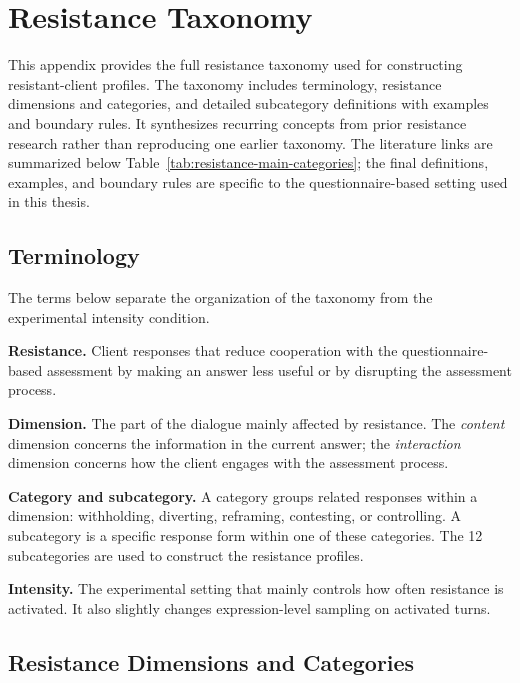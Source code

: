 
\section{Resistance Taxonomy}
\label{s:appendix-taxonomy}

This appendix provides the full resistance taxonomy used for constructing resistant-client profiles. The taxonomy includes terminology, resistance dimensions and categories, and detailed subcategory definitions with examples and boundary rules. It synthesizes recurring concepts from prior resistance research rather than reproducing one earlier taxonomy. The literature links are summarized below Table~\ref{tab:resistance-main-categories}; the final definitions, examples, and boundary rules are specific to the questionnaire-based setting used in this thesis.

\subsection{Terminology}

The terms below separate the organization of the taxonomy from the experimental intensity condition.

\noindent\textbf{Resistance.} Client responses that reduce cooperation with the questionnaire-based assessment by making an answer less useful or by disrupting the assessment process.

\noindent\textbf{Dimension.} The part of the dialogue mainly affected by resistance. The \emph{content} dimension concerns the information in the current answer; the \emph{interaction} dimension concerns how the client engages with the assessment process.

\noindent\textbf{Category and subcategory.} A category groups related responses within a dimension: withholding, diverting, reframing, contesting, or controlling. A subcategory is a specific response form within one of these categories. The 12 subcategories are used to construct the resistance profiles.

\noindent\textbf{Intensity.} The experimental setting that mainly controls how often resistance is activated. It also slightly changes expression-level sampling on activated turns.

\subsection{Resistance Dimensions and Categories}

